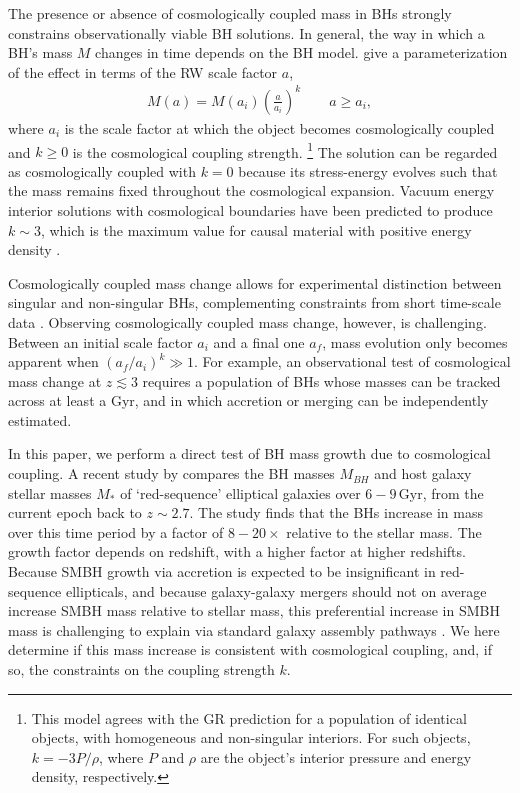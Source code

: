 \documentclass[twocolumn,twocolappendix]{aastex631}
\begin{document}
The presence or absence of cosmologically coupled mass in BHs strongly constrains observationally viable BH solutions.
In general, the way in which a BH's mass $M$ changes in time depends on the BH model.
\citet{cro21} give a parameterization of the effect in terms of the RW scale factor $a$,
%
\begin{align}
  M(a) = M(a_i)\left(\frac{a}{a_i}\right)^{k} \qquad a \geqslant a_i, \label{eqn:coupling}
\end{align}
%
where $a_i$ is the scale factor at which the object becomes cosmologically coupled and $k \geqslant 0$ is the cosmological coupling strength.%
\footnote{This model agrees with the GR prediction for a population of identical objects, with homogeneous and non-singular interiors.
    For such objects, $k=-3P/\rho$, where $P$ and $\rho$ are the object's interior pressure and energy density, respectively.
}
The \cite{nolan1993sources} solution can be regarded as cosmologically coupled with $k=0$ because its stress-energy evolves such that the mass remains fixed throughout the cosmological expansion.
Vacuum energy interior solutions with cosmological boundaries have been predicted to produce $k \sim 3$, which is the maximum value for causal material with positive energy density \citep{cro19}.

Cosmologically coupled mass change allows for experimental distinction between singular and non-singular BHs, complementing constraints from short time-scale data \citep[e.g.][]{sakai2014gravastar, uchikata2016tidal, yunes2016theoretical,cardoso2016gravitational,cardoso2017tests,chirenti2018black,konoplya2019stable,maggio2020does}.
Observing cosmologically coupled mass change, however, is challenging.
Between an initial scale factor $a_i$ and a final one $a_f$, mass evolution only becomes apparent when $(a_f/a_i)^k \gg 1$.
For example, an observational test of cosmological mass change at $z\lesssim3$ requires a population of BHs whose masses can be tracked across at least a Gyr, and in which accretion or merging can be independently estimated.

In this paper, we perform a direct test of BH mass growth due to cosmological coupling.
A recent study by \citet{farrah22b} compares the BH masses $M_{BH}$ and host galaxy stellar masses $M_*$ of `red-sequence' elliptical galaxies over $6-9$\,Gyr, from the current epoch back to $z\sim2.7$.
The study finds that the BHs increase in mass over this time period by a factor of $8-20\times$ relative to the stellar mass.
The growth factor depends on redshift, with a higher factor at higher redshifts.
Because SMBH growth via accretion is expected to be insignificant in red-sequence ellipticals, and because galaxy-galaxy mergers should not on average increase SMBH mass relative to stellar mass, this preferential increase in SMBH mass is challenging to explain via standard galaxy assembly pathways \citep[][\S5]{farrah22b}.
We here determine if this mass increase is consistent with cosmological coupling, and, if so, the constraints on the coupling strength $k$.
 
\end{document}
